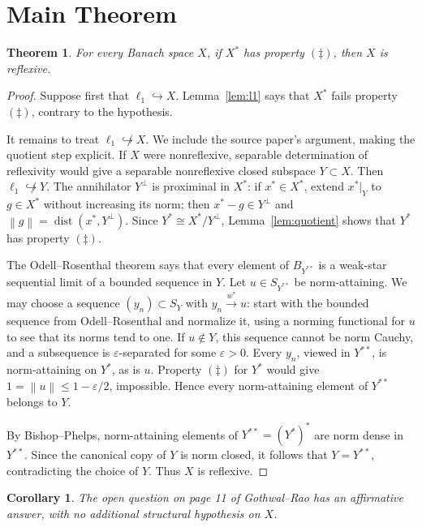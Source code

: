 \documentclass[11pt]{article}
\newtheorem{theorem}{Theorem}
\newtheorem{corollary}{Corollary}
\newcommand{\norm}[1]{\left\lVert #1\right\rVert}
\begin{document}
\section*{Main Theorem}

\begin{theorem}\label{thm:main}
For every Banach space \(X\), if \(X^*\) has property \((\ddagger)\), then
\(X\) is reflexive.
\end{theorem}

\begin{proof}
Suppose first that \(\ell_1\hookrightarrow X\).  Lemma~\ref{lem:l1} says
that \(X^*\) fails property \((\ddagger)\), contrary to the hypothesis.

It remains to treat \(\ell_1\not\hookrightarrow X\).  We include the source
paper's argument, making the quotient step explicit.  If \(X\) were
nonreflexive, separable determination of reflexivity would give a separable
nonreflexive closed subspace \(Y\subset X\).  Then
\(\ell_1\not\hookrightarrow Y\).  The annihilator \(Y^\perp\) is proximinal
in \(X^*\): if \(x^*\in X^*\), extend \(x^*|_Y\) to
\(g\in X^*\) without increasing its norm; then
\(x^*-g\in Y^\perp\) and
\(\norm g=\operatorname{dist}(x^*,Y^\perp)\).  Since
\(Y^*\cong X^*/Y^\perp\), Lemma~\ref{lem:quotient} shows that \(Y^*\) has
property \((\ddagger)\).

The Odell--Rosenthal theorem \cite{OdellRosenthal} says that every element of
\(B_{Y^{**}}\) is a weak-star sequential limit of a bounded sequence in
\(Y\).  Let \(u\in S_{Y^{**}}\) be norm-attaining.  We may choose a sequence
\((y_n)\subset S_Y\) with \(y_n\xrightarrow{w^*}u\): start with the bounded
sequence from Odell--Rosenthal and normalize it, using a norming functional
for \(u\) to see that its norms tend to one.  If \(u\notin Y\), this sequence
cannot be norm Cauchy, and a subsequence is \(\varepsilon\)-separated for
some \(\varepsilon>0\).  Every \(y_n\), viewed in \(Y^{**}\), is
norm-attaining on \(Y^*\), as is \(u\).  Property \((\ddagger)\) for \(Y^*\)
would give \(1=\norm u\leq1-\varepsilon/2\), impossible.  Hence every
norm-attaining element of \(Y^{**}\) belongs to \(Y\).

By Bishop--Phelps, norm-attaining elements of \(Y^{**}=(Y^*)^*\) are norm
dense in \(Y^{**}\).  Since the canonical copy of \(Y\) is norm closed, it
follows that \(Y=Y^{**}\), contradicting the choice of \(Y\).  Thus \(X\)
is reflexive.
\end{proof}

\begin{corollary}
The open question on page 11 of Gothwal--Rao has an affirmative answer, with
no additional structural hypothesis on \(X\).
\end{corollary}
\end{document}
